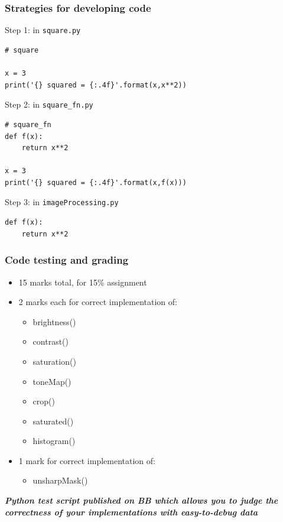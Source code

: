 \documentclass[english,14pt]{beamer}
\begin{document}
\begin{frame}[fragile]

\frametitle{Strategies for developing code}

Step 1: in \texttt{square.py}
\begin{lstlisting}[style=CStyle,basicstyle=\scriptsize]
# square

x = 3
print('{} squared = {:.4f}'.format(x,x**2))
\end{lstlisting}

\pause

Step 2: in \texttt{square\_fn.py}
\begin{lstlisting}[style=CStyle,basicstyle=\scriptsize]
# square_fn
def f(x):
    return x**2

x = 3
print('{} squared = {:.4f}'.format(x,f(x)))
\end{lstlisting}

\pause

Step 3: in \texttt{imageProcessing.py}
\begin{lstlisting}[style=CStyle,basicstyle=\scriptsize]
def f(x):
    return x**2
\end{lstlisting}

\end{frame}

\begin{frame}[fragile]

\frametitle{Code testing and grading}

\vspace*{-3mm}

\begin{itemize}
	\item 15 marks total, for 15\% assignment
	\item 2 marks each for correct implementation of:
	\begin{itemize}
		\item brightness()
		\item contrast()
		\item saturation()
		\item toneMap()
		\item crop()
		\item saturated()
		\item histogram()
	\end{itemize}
	\item 1 mark for correct implementation of:
	\begin{itemize}
		\item unsharpMask()
	\end{itemize}
\end{itemize}

\textbf{\emph{Python test script published on BB which allows you to judge the correctness of your implementations with easy-to-debug data}}

\end{frame}


%
%
%
\end{document}
